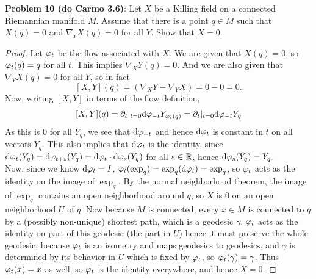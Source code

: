 \documentclass{amsart}
\begin{document}
	\newpage
	\textbf{Problem 10 (do Carmo 3.6)}: Let $X$ be a Killing field on a connected Riemannian manifold $M$. Assume that there is a point $q\in M$ such that $X(q)=0$ and $\nabla_YX(q)=0$ for all $Y$. Show that $X=0$.
	\begin{proof}
		Let $\varphi_t$ be the flow associated with $X$. We are given that $X(q)=0$, so $\varphi_t(q)=q$ for all $t$. This implies $\nabla_X Y(q)=0$. And we are also given that $\nabla_Y X(q)=0$ for all $Y$, so in fact
		$$
		[X,Y](q) = (\nabla_X Y - \nabla_Y X) = 0-0 = 0.
		$$
		Now, writing $[X,Y]$ in terms of the flow definition,
		$$
		[X,Y](q) = \partial_t|_{t=0} \textrm{d}\varphi_{-t} Y_{\varphi_t(q)} = \partial_t|_{t=0} \textrm{d}\varphi_{-t} Y_{q}
		$$
		As this is 0 for all $Y_q$, we see that $\textrm{d}\varphi_{-t}$ and hence $\textrm{d}\varphi_t$ is constant in $t$ on all vectors $Y_q$. This also implies that $\textrm{d}\varphi_t$ is the identity, since $\textrm{d}\varphi_t(Y_q) = \textrm{d}\varphi_{t+s}(Y_q)=\textrm{d}\varphi_t\cdot \textrm{d}\varphi_s(Y_q)$ for all $s\in \mathbb{R}$, hence $\textrm{d}\varphi_s(Y_q)=Y_q$.\\
		
		Now, since we know $\textrm{d}\varphi_t = I$, $\varphi_t(\exp_q)=\exp_q(\textrm{d}\varphi_t) = \exp_q$, so $\varphi_t$ acts as the identity on the image of $\exp_q$. By the normal neighborhood theorem, the image of $\exp_q$ contains an open neighborhood around $q$, so $X$ is 0 on an open neighborhood $U$ of $q$. Now because $M$ is connected, every $x\in M$ is connected to $q$ by a (possibly non-unique) shortest path, which is a geodesic $\gamma$. $\varphi_t$ acts as the identity on part of this geodesic (the part in $U$) hence it must preserve the whole geodesic, because $\varphi_t$ is an isometry and maps geodesics to geodesics, and $\gamma$ is determined by its behavior in $U$ which is fixed by $\varphi_t$, so $\varphi_t(\gamma)=\gamma$. Thus $\varphi_t(x)=x$ as well, so $\varphi_t$ is the identity everywhere, and hence $X=0$.
	\end{proof}
\end{document}
